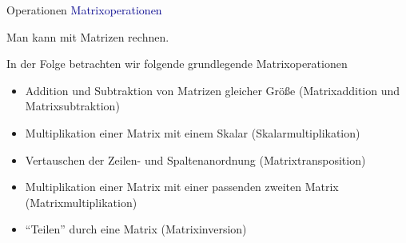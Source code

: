 \documentclass[
  8pt,
  ignorenonframetext,
]{beamer}
\providecommand{\tightlist}{%
  \setlength{\itemsep}{0pt}\setlength{\parskip}{0pt}}
\begin{document}
\begin{frame}{Operationen}
\protect\hypertarget{operationen}{}
\textcolor{darkblue}{Matrixoperationen} 

\small

Man kann mit Matrizen rechnen.

In der Folge betrachten wir folgende grundlegende Matrixoperationen

\begin{itemize}
\tightlist
\item
  Addition und Subtraktion von Matrizen gleicher Größe (Matrixaddition
  und Matrixsubtraktion)
\item
  Multiplikation einer Matrix mit einem Skalar (Skalarmultiplikation)
\item
  Vertauschen der Zeilen- und Spaltenanordnung (Matrixtransposition)
\item
  Multiplikation einer Matrix mit einer passenden zweiten Matrix
  (Matrixmultiplikation)
\item
  ``Teilen'' durch eine Matrix (Matrixinversion)
\end{itemize}
\end{frame}
\end{document}
